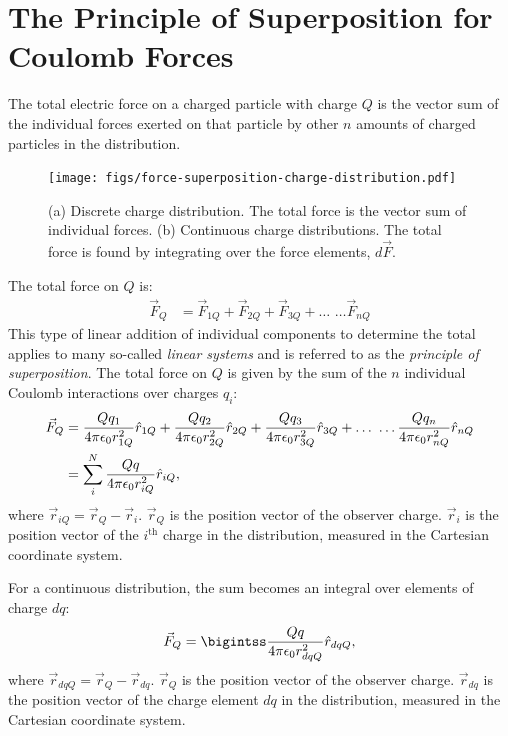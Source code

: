 \documentclass[12pt,b4paper]{article}
\begin{document}
\section*{The Principle of Superposition for Coulomb Forces}
The total electric force on a charged particle with charge $Q$ is the vector sum of the individual forces exerted on that particle by other $n$ amounts of charged particles in the distribution.
\begin{figure}[H]
    \centering
    \texttt{[image: figs/force-superposition-charge-distribution.pdf]}
    \caption{(a) Discrete charge distribution. The total force is the vector sum of individual forces. (b) Continuous charge distributions. The total force is found by integrating over the force elements, $d\vec{F}$.}
    \label{fig:charge-distribution}
\end{figure}
The total force on $Q$ is:
\begin{align}
    \vec{F}_Q&=\vec{F}_{1Q}+\vec{F}_{2Q}+\vec{F}_{3Q}+\ldots\,\,\ldots\vec{F}_{nQ}
\end{align}
This type of linear addition of individual components to determine the total applies to many so-called \textit{linear systems} and is referred to as the \textit{principle of superposition}. The total force on $Q$ is given by the sum of the $n$ individual Coulomb interactions over charges $q_i$:
\begin{align}
    \vec{F}_Q&=\frac{Qq_1}{4\pi\epsilon_0r_{1Q}^2}\hat{r}_{1Q}+\frac{Qq_2}{4\pi\epsilon_0r_{2Q}^2}\hat{r}_{2Q}+\frac{Qq_3}{4\pi\epsilon_0r_{3Q}^2}\hat{r}_{3Q}+\ldots\,\,\ldots\frac{Qq_n}{4\pi\epsilon_0r_{nQ}^2}\hat{r}_{nQ}\notag\\
    &=\sum_i^N\frac{Qq}{4\pi\epsilon_0r_{iQ}^2}\hat{r}_{iQ},
\end{align}
where $\vec{r}_{iQ}=\vec{r}_Q-\vec{r}_i$. $\vec{r}_Q$ is the position vector of the observer charge. $\vec{r}_i$ is the position vector of the $i^{\text{th}}$ charge in the distribution, measured in the Cartesian coordinate system.

For a continuous distribution, the sum becomes an integral over elements of charge $dq$:
\begin{align}
    \vec{F}_Q=\bigintss\frac{Qq}{4\pi\epsilon_0r_{dqQ}^2}\hat{r}_{dqQ},
\end{align}
where $\vec{r}_{dqQ}=\vec{r}_Q-\vec{r}_{dq}$. $\vec{r}_Q$ is the position vector of the observer charge. $\vec{r}_{dq}$ is the position vector of the charge element $dq$ in the distribution, measured in the Cartesian coordinate system.
\end{document}
